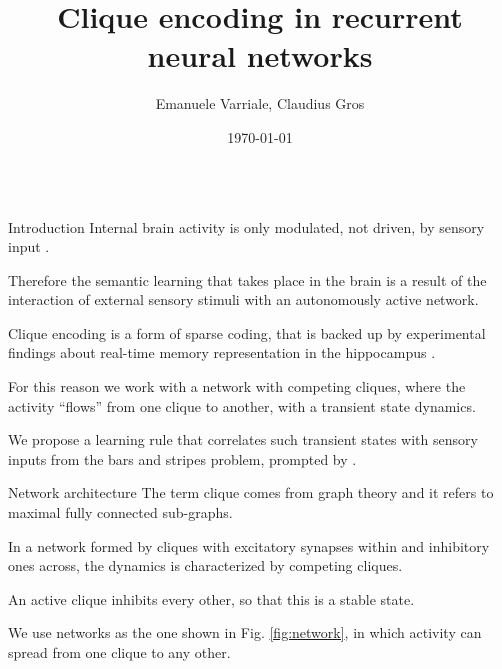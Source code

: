 \documentclass[final,hyperref={pdfpagelabels=false}]{beamer}
\title{Clique encoding in recurrent neural networks} %
\author[varriale@itp.uni-frankfurt.de]{Emanuele Varriale, Claudius Gros}
\institute{Institute for Theoretical Physics, Goethe University, Frankfurt am Main, Germany}
\date{\today}
\begin{document}
\begin{frame}
	
	\begin{columns}
		
		\hfill
		\begin{column}{.30\textwidth}
				\begin{minipage}[T]{.95\textwidth}	%
					\parbox[t][\columnheight]{\textwidth}{

						\begin{block}{Introduction}
							Internal brain activity is only modulated, not driven, by sensory input \cite{fiser2004modulation}. 
							
							Therefore the semantic learning that takes place in the brain is a result of the interaction of external sensory stimuli with an autonomously active network.
							
							Clique encoding is a form of sparse coding, that is backed up by experimental findings about real-time memory representation in the hippocampus \cite{lin2006clique}.
							
							For this reason we work with a network with competing cliques, where the activity ``flows'' from one clique to another, with a transient state dynamics.
							
							We propose a learning rule that correlates such transient states with sensory inputs from the bars and stripes problem, prompted by \cite{gros2010semantic}.
						\end{block}
						
						\vfill
						\begin{block}{Network architecture}
							The term clique comes from graph theory and it refers to maximal fully connected sub-graphs. 
							
							In a network formed by cliques with excitatory synapses within and inhibitory ones across, the dynamics is characterized by competing cliques. 
							
							An active clique inhibits every other, so that this is a stable state.
							
							We use networks as the one shown in Fig. \ref{fig:network}, in which activity can spread from one clique to any other.
										

\end{block}}
\end{minipage}
\end{column}
\end{columns}
\end{frame}
\end{document}
